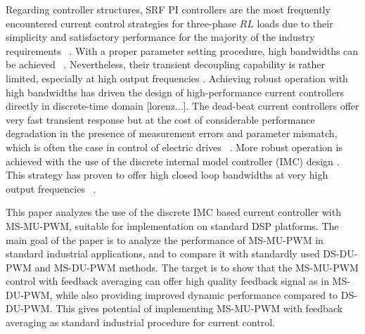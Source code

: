 \documentclass[journal]{IEEEtran}
\begin{document}
Regarding controller structures, SRF PI controllers are the most frequently encountered current control strategies for three-phase $RL$ loads due to their simplicity and satisfactory performance for the majority of the industry requirements ~\cite{rowan1986,bae2003,yepes2014}. With a proper parameter setting procedure, high bandwidths can be achieved ~\cite{yepes2014,holmes2009}. Nevertheless, their transient decoupling capability is rather limited, especially at high output frequencies \cite{lorenz2000}. Achieving robust operation with high bandwidths has driven the design of high-performance current controllers directly in discrete-time domain \cite{bae2003} [lorenz...]. The dead-beat current controllers offer very fast transient response but at the cost of considerable performance degradation in the presence of measurement errors and parameter mismatch, which is often the case in control of electric drives ~\cite{malesani1999,xu2019,rovere2018}. More robust operation is achieved with the use of the discrete internal model controller (IMC) design \cite{lorenz2010}. This strategy has proven to offer high closed loop bandwidths at very high output frequencies ~\cite{commentsHoffmann,vuksa2016,petric2021a}.

This paper analyzes the use of the discrete IMC based current controller with MS-MU-PWM, suitable for implementation on standard DSP platforms. The main goal of the paper is to analyze the performance of MS-MU-PWM in standard industrial applications, and to compare it with standardly used DS-DU-PWM and MS-DU-PWM methods. 
The target is to show that the MS-MU-PWM control with feedback averaging can offer high quality feedback signal as in MS-DU-PWM, while also providing improved dynamic performance compared to DS-DU-PWM. This gives potential of implementing MS-MU-PWM with feedback averaging as standard industrial procedure for current control.
\end{document}
